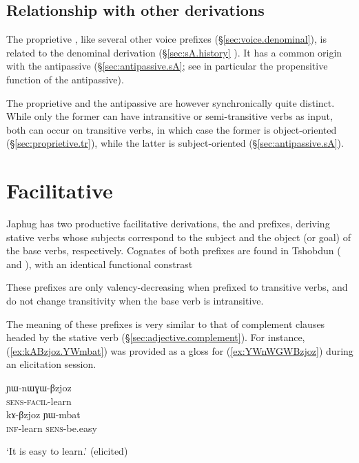 \subsection{Relationship with other derivations} 
The proprietive , like several other voice prefixes (§\ref{sec:voice.denominal}), is related to the denominal  derivation (§\ref{sec:sA.history} ). It has a common origin with the antipassive  (§\ref{sec:antipassive.sA}; see in particular the propensitive function of the antipassive). 

The proprietive and the  antipassive are however synchronically quite distinct. While only the former can have intransitive or semi-transitive verbs as input, both can occur on transitive verbs, in which case the former is object-oriented (§\ref{sec:proprietive.tr}), while the latter is subject-oriented (§\ref{sec:antipassive.sA}).


\section{Facilitative} \label{sec:facilitative}
Japhug has two productive facilitative derivations, the  and  prefixes, deriving stative verbs whose subjects correspond to the subject and the object (or goal) of the base verbs, respectively. Cognates of both prefixes are found in Tshobdun ( and ), with an identical functional constrast \citep{jackson14morpho}


These prefixes are only valency-decreasing when prefixed to transitive verbs, and do not change transitivity when the base verb is intransitive.

The meaning of these prefixes is very similar to that of complement clauses headed by the stative verb  (§\ref{sec:adjective.complement}). For instance, (\ref{ex:kABzjoz.YWmbat}) was provided as a gloss for (\ref{ex:YWnWGWBzjoz}) during an elicitation session.

\begin{exe}
\ex 
\begin{xlist}
\ex \label{ex:YWnWGWBzjoz}
\gll ɲɯ-nɯɣɯ-βzjoz \\
\textsc{sens}-\textsc{facil}-learn \\
\ex \label{ex:kABzjoz.YWmbat}
\gll kɤ-βzjoz ɲɯ-mbat \\
\textsc{inf}-learn \textsc{sens}-be.easy \\
\end{xlist}
\glt `It is easy to learn.' (elicited)
\end{exe}

